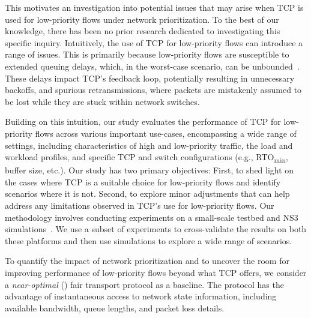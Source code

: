 This motivates an investigation into potential issues that may arise when TCP is used for low-priority flows under network prioritization.
To the best of our knowledge, there has been no prior research dedicated to investigating this specific inquiry.
Intuitively, the use of TCP for low-priority flows can introduce a range of issues. This is primarily because low-priority flows are susceptible to extended queuing delays, which, in the worst-case scenario, can be unbounded~\cite{conquest}. These delays impact TCP's feedback loop, potentially resulting in unnecessary backoffs, and spurious retransmissions, where packets are mistakenly assumed to be lost while they are stuck within network switches.

Building on this intuition, our study evaluates the performance of TCP for low-priority flows across various important use-cases, encompassing a wide range of settings, including characteristics of high and low-priority traffic, the load and workload profiles, and specific TCP and switch configurations (e.g., RTO\textsubscript{min}, buffer size, etc.). 
Our study has two primary objectives: First, to shed light on the cases where TCP is a suitable choice for low-priority flows and identify scenarios where it is not.
Second, to explore minor adjustments that can help address any limitations observed in TCP's use for low-priority flows. Our methodology involves conducting experiments on a small-scale testbed and NS3 simulations~\cite{ns3}. We use a subset of experiments to cross-validate the results on both these platforms and then use simulations to explore a wide range of scenarios.

To quantify the impact of network prioritization and to uncover the room for improving performance of low-priority flows beyond what TCP offers, we consider a \emph{near-optimal} (\nearopt{}) fair transport protocol as a baseline. The \nearopt{} protocol has the advantage of instantaneous access to network state information, including available bandwidth, queue lengths, and packet loss details. 

